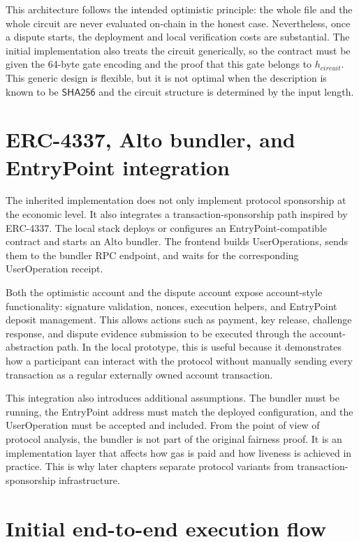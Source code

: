 This architecture follows the intended optimistic principle: the whole file and the whole
circuit are never evaluated on-chain in the honest case. Nevertheless, once a dispute
starts, the deployment and local verification costs are substantial. The initial
implementation also treats the circuit generically, so the contract must be given the
64-byte gate encoding and the proof that this gate belongs to \(h_{circuit}\). This generic
design is flexible, but it is not optimal when the description is known to be
\(\mathsf{SHA256}\) and the circuit structure is determined by the input length.

\section{ERC-4337, Alto bundler, and EntryPoint integration}

The inherited implementation does not only implement protocol sponsorship at the economic
level. It also integrates a transaction-sponsorship path inspired by ERC-4337. The local
stack deploys or configures an EntryPoint-compatible contract and starts an Alto bundler. The
frontend builds UserOperations, sends them to the bundler RPC endpoint, and waits for the
corresponding UserOperation receipt.

Both the optimistic account and the dispute account expose account-style functionality:
signature validation, nonces, execution helpers, and EntryPoint deposit management. This
allows actions such as payment, key release, challenge response, and dispute evidence
submission to be executed through the account-abstraction path. In the local prototype, this
is useful because it demonstrates how a participant can interact with the protocol without
manually sending every transaction as a regular externally owned account transaction.

This integration also introduces additional assumptions. The bundler must be running, the
EntryPoint address must match the deployed configuration, and the UserOperation must be
accepted and included. From the point of view of protocol analysis, the bundler is not part
of the original fairness proof. It is an implementation layer that affects how gas is paid
and how liveness is achieved in practice. This is why later chapters separate protocol
variants from transaction-sponsorship infrastructure.

\section{Initial end-to-end execution flow}


